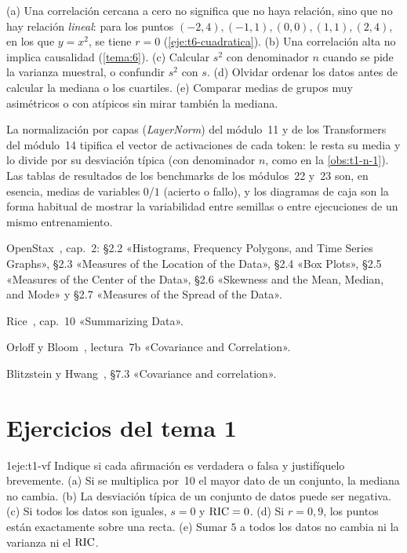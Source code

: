 \begin{observacion}\label{obs:t1-errores}
(a) Una correlación cercana a cero no significa que no haya relación, sino que no hay relación \emph{lineal}: para los puntos $(-2,4),(-1,1),(0,0),(1,1),(2,4)$, en los que $y=x^{2}$, se tiene $r=0$ (\cref{eje:t6-cuadratica}).
(b) Una correlación alta no implica causalidad (\cref{tema:6}).
(c) Calcular $s^{2}$ con denominador $n$ cuando se pide la varianza muestral, o confundir $s^{2}$ con $s$.
(d) Olvidar ordenar los datos antes de calcular la mediana o los cuartiles.
(e) Comparar medias de grupos muy asimétricos o con atípicos sin mirar también la mediana.
\end{observacion}

\begin{observacion}
La normalización por capas (\emph{LayerNorm}) del módulo~11 y de los Transformers del módulo~14 tipifica el vector de activaciones de cada token: le resta su media y lo divide por su desviación típica (con denominador $n$, como en la \cref{obs:t1-n-1}). Las tablas de resultados de los benchmarks de los módulos~22 y~23 son, en esencia, medias de variables $0$/$1$ (acierto o fallo), y los diagramas de caja son la forma habitual de mostrar la variabilidad entre semillas o entre ejecuciones de un mismo entrenamiento.
\end{observacion}

\begin{lecturas}
\item OpenStax~\cite{openstax}, cap.~2: §2.2 «Histograms, Frequency Polygons, and Time Series Graphs», §2.3 «Measures of the Location of the Data», §2.4 «Box Plots», §2.5 «Measures of the Center of the Data», §2.6 «Skewness and the Mean, Median, and Mode» y §2.7 «Measures of the Spread of the Data».
\item Rice~\cite{rice}, cap.~10 «Summarizing Data».
\item Orloff y Bloom~\cite{mit1805}, lectura~7b «Covariance and Correlation».
\item Blitzstein y Hwang~\cite{bh}, §7.3 «Covariance and correlation».
\end{lecturas}

\section*{Ejercicios del tema 1}

\begin{ejercicio}{1}{eje:t1-vf}
Indique si cada afirmación es verdadera o falsa y justifíquelo brevemente.
(a) Si se multiplica por~10 el mayor dato de un conjunto, la mediana no cambia.
(b) La desviación típica de un conjunto de datos puede ser negativa.
(c) Si todos los datos son iguales, $s=0$ y $\operatorname{RIC}=0$.
(d) Si $r=0{,}9$, los puntos están exactamente sobre una recta.
(e) Sumar $5$ a todos los datos no cambia ni la varianza ni el $\operatorname{RIC}$.
\end{ejercicio}

